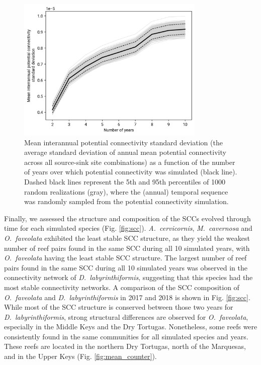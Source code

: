 \documentclass[preprint,12pt,authoryear]{elsarticle}
\begin{document}
	\begin{figure}
		\centering
		\includegraphics[width=0.8\textwidth]{figures/fig_cm_std.png}
		\caption{Mean interannual potential connectivity standard deviation (the average standard deviation of annual mean potential connectivity across all source-sink site combinations) as a function of the number of years over which potential connectivity was simulated (black line). Dashed black lines represent the 5th and 95th percentiles of 1000 random realizations (gray), where the (annual) temporal sequence was randomly sampled from the potential connectivity simulation.}\label{fig:saturation}
	\end{figure}
	
	Finally, we assessed the structure and composition of the SCCs evolved through time for each simulated species (Fig. \ref{fig:scc}). \textit{A.~cervicornis}, \textit{M.~cavernosa} and \textit{O.~faveolata} exhibited the least stable SCC structure, as they yield the weakest number of reef pairs found in the same SCC during all 10 simulated years, with \textit{O.~faveolata} having the least stable SCC structure. The largest number of reef pairs found in the same SCC during all 10 simulated years was observed in the connectivity network of \textit{D.~labyrinthiformis}, suggesting that this species had the most stable connectivity networks. A comparison of the SCC composition of \textit{O.~faveolata} and \textit{D.~labyrinthiformis} in 2017 and 2018 is shown in Fig. \ref{fig:scc}. While most of the SCC structure is conserved between those two years for \textit{D.~labyrinthiformis}, strong structural differences are observed for \textit{O.~faveolata}, especially in the Middle Keys and the Dry Tortugas. Nonetheless, some reefs were consistently found in the same communities for all simulated species and years. These reefs are located in the northern Dry Tortugas, north of the Marquesas, and in the Upper Keys (Fig. \ref{fig:mean_counter}).
	
\end{document}
